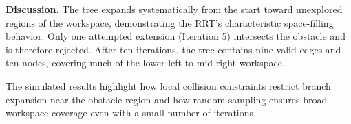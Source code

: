 \documentclass[11pt]{article}
\begin{document}
\textbf{Discussion.}
The tree expands systematically from the start toward unexplored regions of the workspace, demonstrating the RRT’s characteristic space-filling behavior.  
Only one attempted extension (Iteration 5) intersects the obstacle and is therefore rejected. After ten iterations, the tree contains nine valid edges and ten nodes, covering much of the lower-left to mid-right workspace.

The simulated results highlight how local collision constraints restrict branch expansion near the obstacle region and how random sampling ensures broad workspace coverage even with a small number of iterations.
\end{document}
